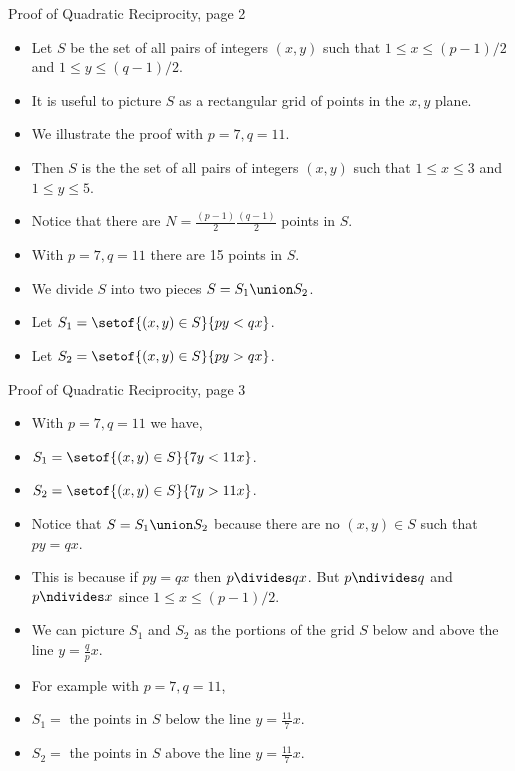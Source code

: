 \documentclass{beamer}
\begin{document}

\begin{frame}{Proof of Quadratic Reciprocity, page 2}

\begin{itemize}
  \item Let $S$ be the set of all pairs of integers $(x,y)$ such that
  $1\leq x \leq (p-1)/2$ and $1\leq y \leq (q-1)/2$.
  \item It is useful to picture $S$ as a rectangular grid of points in the $x,y$ plane.
  \item We illustrate the proof with $p=7, q=11$.
  \item Then $S$ is the the set of all pairs of integers $(x,y)$ such that
  $1\leq x \leq 3$ and $1\leq y \leq 5$.
  \item Notice that there are $N = \frac{(p-1)}{2}\frac{(q-1)}{2}$ points in $S$.
  \item With $p=7, q=11$ there are 15 points in $S$.
  \item We divide $S$ into two pieces $S = S_1 \union S_2$.
  \item Let $S_1 = \setof{(x,y)\in S}{py < qx}$.
  \item Let $S_2 = \setof{(x,y)\in S}{py > qx}$.
\end{itemize}
\end{frame}

\begin{frame}{Proof of Quadratic Reciprocity, page 3}

\begin{itemize}
  \item With $p=7, q=11$ we have,
  \item $S_1 = \setof{(x,y)\in S}{7y < 11x}$.
  \item $S_2 = \setof{(x,y)\in S}{7y > 11x}$.
  \item Notice that $S= S_1 \union S_2$ because there are no $(x,y)\in S$ such that $py = qx$.
  \item This is because if $py=qx$ then $p\divides qx$. But $p\ndivides q$ and $p\ndivides x$ since $1\leq x \leq (p-1)/2$.
  \item We can picture $S_1$ and $S_2$ as the portions of the grid $S$ below and above the line $y=\frac{q}{p} x$.
  \item For example with $p=7, q=11$,
  \item $S_1 = $ the points in $S$ below the line $y=\frac{11}{7}x$.
  \item $S_2 = $ the points in $S$ above the line $y=\frac{11}{7}x$.
\end{itemize}
\end{frame}

\end{document}
